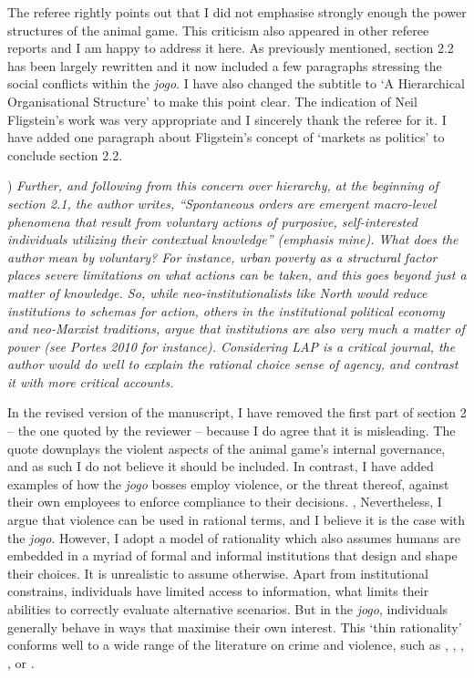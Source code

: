 \documentclass[a4paper,12pt]{article}
\begin{document}
\vspace{.25cm}

The referee rightly points out that I did not emphasise strongly enough the power structures of the animal game. This criticism also appeared in other referee reports and I am happy to address it here. As previously mentioned, section 2.2 has been largely rewritten and it now included a few paragraphs stressing the social conflicts within the \textit{jogo}. I have also changed the subtitle to `A Hierarchical Organisational Structure' to make this point clear. The indication of Neil Fligstein's work was very appropriate and I sincerely thank the referee for it. I have added one paragraph about Fligstein's concept of `markets as politics' to conclude section 2.2.

\vspace{.5cm}

) \textit{Further, and following from this concern over hierarchy, at the beginning of section 2.1, the author writes, \emph{``Spontaneous orders are emergent macro-level phenomena that result from voluntary actions of purposive, self-interested individuals utilizing their contextual knowledge}'' (emphasis mine). What does the author mean by voluntary? For instance, urban poverty as a structural factor places severe limitations on what actions can be taken, and this goes beyond just a matter of knowledge. So, while neo-institutionalists like North would reduce institutions to schemas for action, others in the institutional political economy and neo-Marxist traditions, argue that institutions are also very much a matter of power (see Portes 2010 for instance). Considering LAP is a critical journal, the author would do well to explain the rational choice sense of agency, and contrast it with more critical accounts.}

\vspace{.25cm}

In the revised version of the manuscript, I have removed the first part of section 2 -- the one quoted by the reviewer -- because I do agree that it is misleading. The quote downplays the violent aspects of the animal game's internal governance, and as such I do not believe it should be included. In contrast, I have added examples of how the \textit{jogo} bosses employ violence, or the threat thereof, against their own employees to enforce compliance to their decisions. 
,
Nevertheless, I argue that violence can be used in rational terms, and I believe it is the case with the \textit{jogo}. However, I adopt a model of rationality which also assumes humans are embedded in a myriad of formal and informal institutions that design and shape their choices. It is unrealistic to assume otherwise. Apart from institutional constrains, individuals have limited access to information, what limits their abilities to correctly evaluate alternative scenarios. But in the \textit{jogo}, individuals generally behave in ways that maximise their own interest. This `thin rationality' conforms well to a wide range of the literature on crime and violence, such as \citet{balcells2010rivalry}, \citet{gambetta1996sicilian,gambetta2009codes}, \citet{kalyvas2006logic}, \citet{leeson2010pirational}, or \citet{skarbek2011governance,skarbek2012prison}. 
\end{document}
